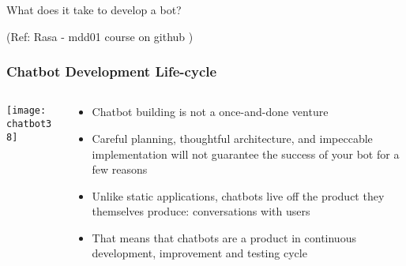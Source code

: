 \begin{frame}[fragile]\frametitle{}
\begin{center}
{\Large What does it take to develop a bot?}
\end{center}

{\tiny (Ref: Rasa - mdd01 course on github )}

\end{frame}

\begin{frame}[fragile]\frametitle{Chatbot Development Life-cycle}

    \begin{columns}
    \begin{column}[t]{0.5\linewidth}
\begin{center}
\texttt{[image: chatbot38]}
\end{center}
\end{column}
    \begin{column}[t]{0.5\linewidth}
\begin{itemize}
\item Chatbot building is not a once-and-done venture
\item Careful planning, thoughtful architecture, and impeccable implementation will not guarantee the success of your bot for a few reasons
\item Unlike static applications, chatbots live off the product they themselves produce: conversations with users
\item That means that chatbots are a product in continuous development, improvement and testing cycle
\end{itemize}
\end{column}
\end{columns}
\end{frame}

